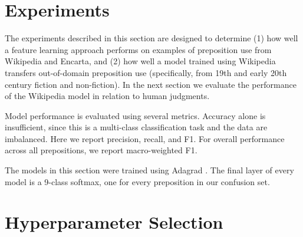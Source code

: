 
\section{Experiments}
\label{sec:PrepositionExperiments}

The experiments described in this section are designed to determine (1) how well a feature learning approach performs on examples of preposition use from Wikipedia and Encarta, and (2) how well a model trained using Wikipedia transfers out-of-domain preposition use (specifically, from 19th and early 20th century fiction and non-fiction).  In the next section we evaluate the performance of the Wikipedia model in relation to human judgments. 

Model performance is evaluated using several metrics.  Accuracy alone is insufficient, since this is a multi-class classification task and the data are imbalanced.  Here we report precision, recall, and F1.  For overall performance across all prepositions, we report macro-weighted F1. 

The models in this section were trained using Adagrad \cite{duchi2011adaptive}.  The final layer of every model is a 9-class softmax, one for every preposition in our confusion set.

\section{Hyperparameter Selection}


